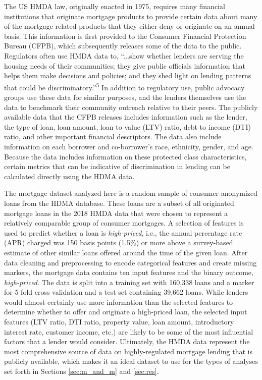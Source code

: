 \documentclass[information,article,submit,moreauthors,pdftex]{definitions/mdpi}
\begin{document}
The US HMDA law, originally enacted in 1975, requires many financial institutions that originate mortgage products to provide certain data about many of the mortgage-related products that they either deny or originate on an annual basis. This information is first provided to the Consumer Financial Protection Bureau (CFPB), which subsequently releases some of the data to the public. Regulators often use HMDA data to, ``...show whether lenders are serving the housing needs of their communities; they give public officials information that helps them make decisions and policies; and they shed light on lending patterns that could be discriminatory.''\textsuperscript{5} In addition to regulatory use, public advocacy groups use these data for similar purposes, and the lenders themselves use the data to benchmark their community outreach relative to their peers.  The publicly available data that the CFPB releases includes information such as the lender, the type of loan, loan amount, loan to value (LTV) ratio, debt to income (DTI) ratio, and other important financial descriptors. The data also include information on each borrower and co-borrower’s race, ethnicity, gender, and age. Because the data includes information on these protected class characteristics, certain metrics that can be indicative of discrimination in lending can be calculated directly using the HDMA data. 

The mortgage dataset analyzed here is a random sample of consumer-anonymized loans from the HDMA database. These loans are a subset of all originated mortgage loans in the 2018 HMDA data that were chosen to represent a relatively comparable group of consumer mortgages.  A selection of features is used to predict whether a loan is \textit{high-priced}, i.e., the annual percentage rate (APR) charged was 150 basis points (1.5\%) or more above a survey-based estimate of other similar loans offered around the time of the given loan.  After data cleaning and preprocessing to encode categorical features and create missing markers, the mortgage data contains ten input features and the binary outcome, \textit{high-priced}. The data is split into a training set with 160,338 loans and a marker for 5 fold cross validation and a test set containing 39,662 loans. While lenders would almost certainly use more information than the selected features to determine whether to offer and originate a high-priced loan, the selected input features (LTV ratio, DTI ratio, property value, loan amount, introductory interest rate, customer income, etc.) are likely to be some of the most influential factors that a lender would consider.  Ultimately, the HMDA data represent the most comprehensive source of data on highly-regulated mortgage lending that is publicly available, which makes it an ideal dataset to use for the types of analyses set forth in Sections \ref{sec:m_and_m} and \ref{sec:res}.  
\end{document}
